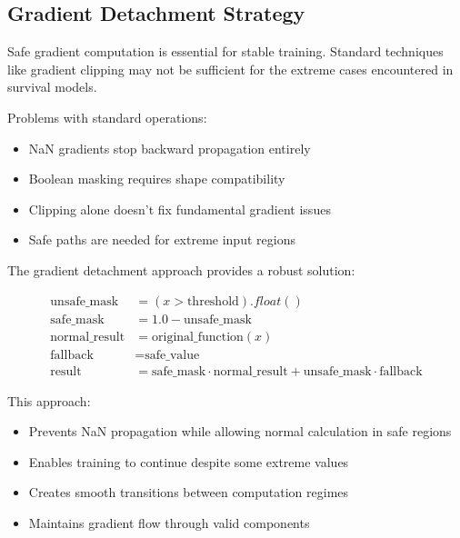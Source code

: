 \subsection{Gradient Detachment Strategy}

Safe gradient computation is essential for stable training. Standard techniques like gradient clipping may not be sufficient for the extreme cases encountered in survival models.

\begin{notebox}[title=Gradient Challenges]
Problems with standard operations:
\begin{itemize}
    \item NaN gradients stop backward propagation entirely
    \item Boolean masking requires shape compatibility
    \item Clipping alone doesn't fix fundamental gradient issues
    \item Safe paths are needed for extreme input regions
\end{itemize}
\end{notebox}

The gradient detachment approach provides a robust solution:

\begin{equationbox}[title=Gradient Detachment With Safe Masking]
\begin{align}
    \text{unsafe\_mask} &= (x > \text{threshold}).float() \\
    \text{safe\_mask} &= 1.0 - \text{unsafe\_mask} \\
    \text{normal\_result} &= \text{original\_function}(x) \\
    \text{fallback} &= \text{safe\_value} \\
    \text{result} &= \text{safe\_mask} \cdot \text{normal\_result} + \text{unsafe\_mask} \cdot \text{fallback}
\end{align}

This approach:
\begin{itemize}
    \item Prevents NaN propagation while allowing normal calculation in safe regions
    \item Enables training to continue despite some extreme values
    \item Creates smooth transitions between computation regimes
    \item Maintains gradient flow through valid components
\end{itemize}
\end{equationbox}

